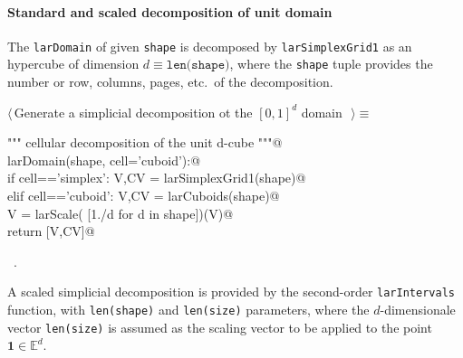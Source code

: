 \documentclass[11pt,oneside]{article}	%
\def\E{\mathbb{E}}
\begin{document}
\paragraph{Standard and scaled decomposition of unit domain}
The \texttt{larDomain} of given \texttt{shape} is decomposed by \texttt{larSimplexGrid1} as an hypercube of dimension $d \equiv\texttt{len(shape)}$, where the \texttt{shape} tuple provides the number or row, columns, pages, etc.~of the decomposition.

\begin{flushleft} \small \label{scrap1}
$\langle\,$Generate a simplicial decomposition ot the $[0,1]^d$ domain\nobreak\ {\footnotesize {}}$\,\rangle\equiv$
\vspace{-1ex}
\begin{list}{}{} \item
\mbox{}\verb@""" cellular decomposition of the unit d-cube """@\\
\mbox{}\verb@def larDomain(shape, cell='cuboid'):@\\
\mbox{}\verb@   if cell=='simplex': V,CV = larSimplexGrid1(shape)@\\
\mbox{}\verb@   elif cell=='cuboid': V,CV = larCuboids(shape)@\\
\mbox{}\verb@   V = larScale( [1./d for d in shape])(V)@\\
\mbox{}\verb@   return [V,CV]@\\
\mbox{}\verb@@{\NWsep}
\end{list}
\vspace{-1ex}
\footnotesize\addtolength{\baselineskip}{-1ex}
\begin{list}{}{\setlength{\itemsep}{-\parsep}\setlength{\itemindent}{-\leftmargin}}
\item \NWtxtMacroRefIn\ .
\end{list}
\end{flushleft}

A scaled simplicial decomposition is provided by the second-order  \texttt{larIntervals} function, with \texttt{len(shape)} and \texttt{len(size)} parameters, where the $d$-dimensionale vector \texttt{len(size)} is assumed as the scaling vector to be applied to the point $\mathbf{1}\in\E^d$.
\end{document}
